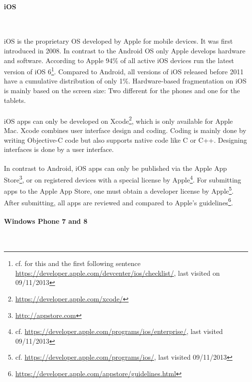 \paragraph{iOS}$\;$

\vspace{0.75em}
iOS is the proprietary OS developed by Apple for mobile devices. It was first introduced in 2008. In contrast to the Android OS only Apple develops hardware and software. According to Apple 94\% of all active iOS devices run the latest version of iOS 6\footnote{cf. for this and the first following sentence \url{https://developer.apple.com/devcenter/ios/checklist/}, last visited on 09/11/2013}. Compared to Android, all versions of iOS released before 2011 have a cumulative distribution of only 1\%. Hardware-based fragmentation on iOS is mainly based on the screen size: Two different for the phones and one for the tablets.
\\
\\
iOS apps can only be developed on Xcode\footnote{\url{https://developer.apple.com/xcode/}}, which is only available for Apple Mac. Xcode combines user interface design and coding. Coding is mainly done by writing Objective-C code but also supports native code like C or C++. Designing interfaces is done by a user interface.
\\
\\
In contrast to Android, iOS apps can only be published via the Apple App Store\footnote{\url{http://appstore.com}}, or on registered devices with a special license by Apple\footnote{cf. \url{https://developer.apple.com/programs/ios/enterprise/}, last visited 09/11/2013}. For submitting apps to the Apple App Store, one must obtain a developer license by Apple\footnote{cf. \url{https://developer.apple.com/programs/ios/}, last visited 09/11/2013}. After submitting, all apps are reviewed and compared to Apple's guidelines\footnote{\url{https://developer.apple.com/appstore/guidelines.html}}.

\paragraph{Windows Phone 7 and 8}$\;$

